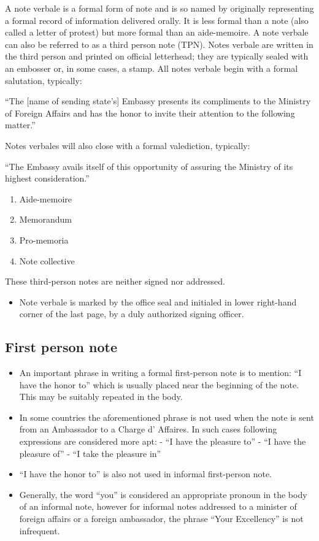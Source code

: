 \documentclass[
  openany]{book}
\providecommand{\tightlist}{%
  \setlength{\itemsep}{0pt}\setlength{\parskip}{0pt}}
\begin{document}
A note verbale is a formal form of note and is so named by originally representing a formal record of information delivered orally. It is less formal than a note (also called a letter of protest) but more formal than an aide-memoire. A note verbale can also be referred to as a third person note (TPN). Notes verbale are written in the third person and printed on official letterhead; they are typically sealed with an embosser or, in some cases, a stamp. All notes verbale begin with a formal salutation, typically:

``The {[}name of sending state's{]} Embassy presents its compliments to the Ministry of Foreign Affairs and has the honor to invite their attention to the following matter.''

Notes verbales will also close with a formal valediction, typically:

``The Embassy avails itself of this opportunity of assuring the Ministry of its highest consideration.''

\begin{enumerate}
\def\labelenumi{\arabic{enumi}.}
\setcounter{enumi}{1}
\tightlist
\item
  Aide-memoire
\item
  Memorandum
\item
  Pro-memoria
\item
  Note collective
\end{enumerate}

These third-person notes are neither signed nor addressed.

\begin{itemize}
\tightlist
\item
  Note verbale is marked by the office seal and initialed in lower right-hand corner of the last page, by a duly authorized signing officer.
\end{itemize}

\hypertarget{first-person-note}{%
\subsection{First person note}\label{first-person-note}}

\begin{itemize}
\tightlist
\item
  An important phrase in writing a formal first-person note is to mention: ``I have the honor to'' which is usually placed near the beginning of the note. This may be suitably repeated in the body.
\item
  In some countries the aforementioned phrase is not used when the note is sent from an Ambassador to a Charge d' Affaires. In such cases following expressions are considered more apt:
  - ``I have the pleasure to''
  - ``I have the pleasure of''
  - ``I take the pleasure in''
\item
  ``I have the honor to'' is also not used in informal first-person note.
\item
  Generally, the word ``you'' is considered an appropriate pronoun in the body of an informal note, however for informal notes addressed to a minister of foreign affairs or a foreign ambassador, the phrase ``Your Excellency'' is not infrequent.
\end{itemize}
\end{document}
